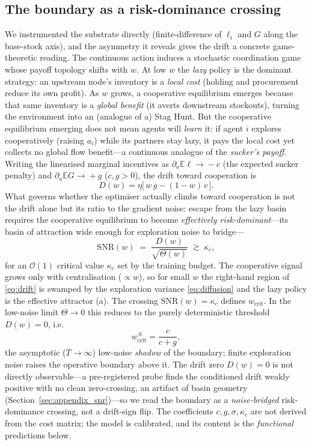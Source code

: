 \documentclass[letterpaper]{article}
\theoremstyle{plain}
\newcommand{\wcrit}{w_{\mathrm{crit}}}
\begin{document}
\subsection{The boundary as a risk-dominance crossing}
We instrumented the substrate directly (finite-difference of $\ell_i$ and $G$
along the base-stock axis), and the asymmetry it reveals gives the drift a
concrete game-theoretic reading. The continuous action induces a stochastic
coordination game whose payoff topology shifts with $w$. At low $w$ the
\emph{lazy} policy is the dominant strategy: an upstream node's inventory is a
\emph{local cost} (holding and procurement reduce its own profit). As $w$ grows,
a cooperative equilibrium emerges because that same inventory is a \emph{global
benefit} (it averts downstream stockouts), turning the environment into an
(analogue of a) Stag Hunt. But the cooperative equilibrium emerging does not mean
agents will \emph{learn} it: if agent $i$ explores cooperatively (raising $a_i$)
while its partners stay lazy, it pays the local cost yet collects no global flow
benefit---a continuous analogue of the \emph{sucker's payoff}. Writing the
linearised marginal incentives as $\partial_a\mathbb{E}\ell\!\to\!-c$ (the
expected sucker penalty) and $\partial_a\mathbb{E}G\!\to\!+g$ ($c,g>0$), the
drift toward cooperation is
\begin{equation}
  D(w)=\eta\big[\,w\,g-(1-w)\,c\,\big].
  \label{eq:drift}
\end{equation}
What governs whether the optimiser actually climbs toward cooperation is not the
drift alone but its ratio to the gradient noise: escape from the lazy basin
requires the cooperative equilibrium to become \emph{effectively
risk-dominant}---its basin of attraction wide enough for exploration noise to
bridge---
\begin{equation}
  \mathrm{SNR}(w)\;=\;\frac{D(w)}{\sqrt{\Theta(w)}}\;\gtrsim\;\kappa_c ,
  \label{eq:snr}
\end{equation}
for an $\mathcal{O}(1)$ critical value $\kappa_c$ set by the training
budget. The cooperative signal grows only with centralisation
($\propto w$), so for small $w$ the right-hand region of \eqref{eq:drift}
is swamped by the exploration variance \eqref{eq:diffusion} and the lazy
policy is the effective attractor (a). The crossing
$\mathrm{SNR}(w)=\kappa_c$ defines $\wcrit$. In the low-noise limit
$\Theta\!\to\!0$ this reduces to the purely deterministic threshold
$D(w)=0$, i.e.
\begin{equation}
  \wcrit^{\,0}=\frac{c}{c+g},
  \label{eq:wcrit}
\end{equation}
the asymptotic ($T\!\to\!\infty$) low-noise \emph{shadow} of the boundary; finite
exploration noise raises the operative boundary above it. The drift zero
$D(w){=}0$ is not directly observable---a pre-registered probe finds the
conditioned drift weakly positive with no clean zero-crossing, an artifact of
basin geometry (Section~\ref{sec:appendix_snr})---so we read the boundary as a
\emph{noise-bridged} risk-dominance crossing, not a drift-sign flip. The
coefficients $c,g,\sigma,\kappa_c$ are not derived from the cost matrix; the
model is calibrated, and its content is the \emph{functional} predictions below.
\end{document}
